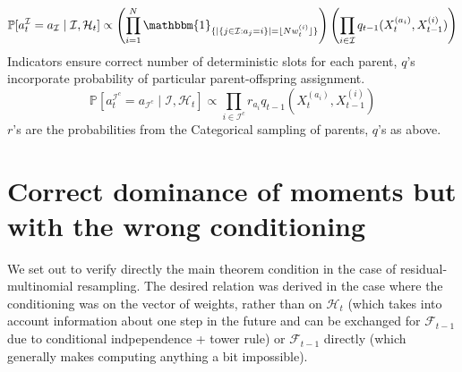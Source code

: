 \documentclass{article}
\newcommand{\Prob}{\mathbb{P}}
\newcommand{\I}[1]{\mathbbm{1}_{\{#1\}}}
\newcommand{\1}[1]{\mathbbm{1}_{#1}}
\newcommand{\flnw}[1][i]{\lfloor N w_t^{(#1)} \rfloor}
\begin{document}
\begin{equation}
\Prob[ a_t^{\mathcal{I}} = a_{\mathcal{I}} \mid \mathcal{I}, \mathcal{H}_t ]
\propto \left( \prod_{i=1}^N \I{ |\{ j \in \mathcal{I} : a_j =i \}| = \flnw } \right)
        \left( \prod_{i\in\mathcal{I}} q_{t-1}(X_t^{(a_i)}, X_{t-1}^{(i)} ) \right)
\end{equation}
Indicators ensure correct number of deterministic slots for each parent, $q$'s incorporate probability of particular parent-offspring assignment.
\begin{equation}
\Prob[ a_t^{\mathcal{I}^c} = a_{\mathcal{I}^c} \mid \mathcal{I}, \mathcal{H}_t ]
\propto \prod_{i\in\mathcal{I}^c} r_{a_i} q_{t-1}(X_t^{(a_i)}, X_{t-1}^{(i)} ) 
\end{equation}
$r$'s are the probabilities from the Categorical sampling of parents, $q$'s as above.




\section{Correct dominance of moments but with the wrong conditioning}

We set out to verify directly the main theorem condition in the case of residual-multinomial resampling. The desired relation was derived in the case where the conditioning was on the vector of weights, rather than on $\mathcal{H}_t$ (which takes into account information about one step in the future and can be exchanged for $\mathcal{F}_{t-1}$ due to conditional indpependence + tower rule) or $\mathcal{F}_{t-1}$ directly (which generally makes computing anything a bit impossible).\\
\end{document}

